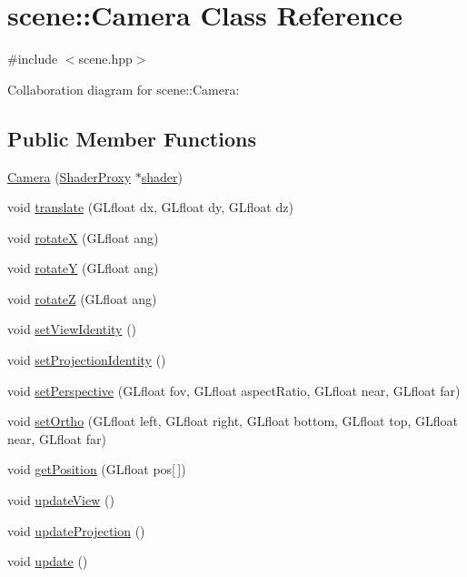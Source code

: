 \hypertarget{classscene_1_1_camera}{}\section{scene\+:\+:Camera Class Reference}
\label{classscene_1_1_camera}


{\ttfamily \#include $<$scene.\+hpp$>$}



Collaboration diagram for scene\+:\+:Camera\+:
\subsection*{Public Member Functions}
\begin{DoxyCompactItemize}
\item 
\mbox{\hyperlink{classscene_1_1_camera_ac316cb07964d6e5a40ad4d40f3bfaa16}{Camera}} (\mbox{\hyperlink{classshaderutils_1_1_shader_proxy}{Shader\+Proxy}} $\ast$\mbox{\hyperlink{classscene_1_1_camera_a114ec90a596436a0598685d877f6b9d6}{shader}})
\item 
void \mbox{\hyperlink{classscene_1_1_camera_abcd0b4dc8f06f5af319d606f8a0571b8}{translate}} (G\+Lfloat dx, G\+Lfloat dy, G\+Lfloat dz)
\item 
void \mbox{\hyperlink{classscene_1_1_camera_a9471a8e5dcf3d6ad43b2199e6c069740}{rotateX}} (G\+Lfloat ang)
\item 
void \mbox{\hyperlink{classscene_1_1_camera_aa307f8aec5276aaf1a0a642d87a22ff0}{rotateY}} (G\+Lfloat ang)
\item 
void \mbox{\hyperlink{classscene_1_1_camera_a21510ead71ccba6081a174b88271a492}{rotateZ}} (G\+Lfloat ang)
\item 
void \mbox{\hyperlink{classscene_1_1_camera_a776972079afd08878cc6e2af5729077e}{set\+View\+Identity}} ()
\item 
void \mbox{\hyperlink{classscene_1_1_camera_acf487ccfb996785c5e8aa19f43c816a6}{set\+Projection\+Identity}} ()
\item 
void \mbox{\hyperlink{classscene_1_1_camera_a2db7f82d5e791300c576fcbb4f3410bf}{set\+Perspective}} (G\+Lfloat fov, G\+Lfloat aspect\+Ratio, G\+Lfloat near, G\+Lfloat far)
\item 
void \mbox{\hyperlink{classscene_1_1_camera_a5bf781a2af68123231586bb14438c865}{set\+Ortho}} (G\+Lfloat left, G\+Lfloat right, G\+Lfloat bottom, G\+Lfloat top, G\+Lfloat near, G\+Lfloat far)
\item 
void \mbox{\hyperlink{classscene_1_1_camera_a069e3e526252f3b46f46f4e131187f97}{get\+Position}} (G\+Lfloat pos\mbox{[}$\,$\mbox{]})
\item 
void \mbox{\hyperlink{classscene_1_1_camera_abf4d10335c5edecae6a7a746e2de4ee1}{update\+View}} ()
\item 
void \mbox{\hyperlink{classscene_1_1_camera_a1b2d1eef3aa84137c86923ffa7bdb653}{update\+Projection}} ()
\item 
void \mbox{\hyperlink{classscene_1_1_camera_a3c31906eda3207d7a2fc2475d9b3d40f}{update}} ()
\end{DoxyCompactItemize}
